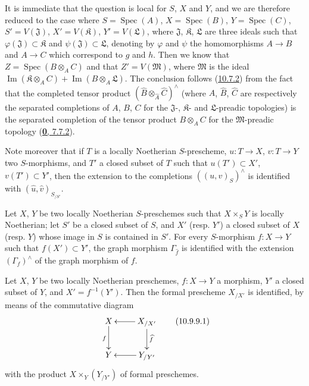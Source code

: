 It is immediate that the question is local for $S$, $X$ and $Y$, and we
are therefore reduced to the case where $S=\operatorname{Spec}(A)$,
$X=\operatorname{Spec}(B)$, $Y=\operatorname{Spec}(C)$,
$S'=V(\mathfrak{J})$, $X'=V(\mathfrak{K})$, $Y'=V(\mathfrak{L})$, where
$\mathfrak{J}$, $\mathfrak{K}$, $\mathfrak{L}$ are three ideals such
that $\varphi(\mathfrak{J})\subset\mathfrak{K}$ and
$\psi(\mathfrak{J})\subset\mathfrak{L}$, denoting by $\varphi$ and
$\psi$ the homomorphisms $A\to B$ and $A\to C$ which correspond to $g$
and $h$. Then we know that $Z=\operatorname{Spec}(B\otimes_A C)$ and that
$Z'=V(\mathfrak{M})$, where $\mathfrak{M}$ is the ideal
$\operatorname{Im}(\mathfrak{K}\otimes_A C)
+\operatorname{Im}(B\otimes_A\mathfrak{L})$. The conclusion follows
(\hyperref[I.10.7.2]{10.7.2}) from the fact that the completed tensor
product $(\widehat B\otimes_{\widehat A}\widehat C)^\wedge$ (where
$\widehat A$, $\widehat B$, $\widehat C$ are respectively the separated
completions of $A$, $B$, $C$ for the $\mathfrak{J}$-, $\mathfrak{K}$-
and $\mathfrak{L}$-preadic topologies) is the separated completion of
the tensor product $B\otimes_A C$ for the $\mathfrak{M}$-preadic
topology (\hyperref[0.7.7.2]{\textbf{0}, 7.7.2}).

Note moreover that if $T$ is a locally Noetherian $S$-prescheme,
$u:T\to X$, $v:T\to Y$ two $S$-morphisms, and $T'$ a closed subset of
$T$ such that $u(T')\subset X'$, $v(T')\subset Y'$, then the extension
to the completions $((u,v)_S)^\wedge$ is identified with
$(\widehat u,\widehat v)_{S_{/S'}}$.

\begin{corollary}[10.9.8]
\label{I.10.9.8}
Let $X$, $Y$ be two locally Noetherian $S$-preschemes such that
$X\times_S Y$ is locally Noetherian; let $S'$ be a closed subset of
$S$, and $X'$ \textup{(resp. $Y'$)} a closed subset of $X$ \textup{(resp. $Y$)} whose
image in $S$ is contained in $S'$. For every $S$-morphism
$f:X\to Y$ such that $f(X')\subset Y'$, the graph morphism
$\Gamma_{\widehat f}$ is identified with the extension
$(\Gamma_f)^\wedge$ of the graph morphism of $f$.
\end{corollary}

\begin{corollary}[10.9.9]
\label{I.10.9.9}
Let $X$, $Y$ be two locally Noetherian preschemes, $f:X\to Y$ a
morphism, $Y'$ a closed subset of $Y$, and $X'=f^{-1}(Y')$. Then the
formal prescheme $X_{/X'}$ is identified, by means of the commutative
diagram
\[ \xymatrix{
    X\ar[d]_f &
    X_{/X'}\ar[l]\ar[d]^{\widehat f}\\
    Y &
    Y_{/Y'}\ar[l]
  }
\tag{10.9.9.1}\label{I.10.9.9.1}
\]
with the product $X\times_Y(Y_{/Y'})$ of formal preschemes.
\end{corollary}

